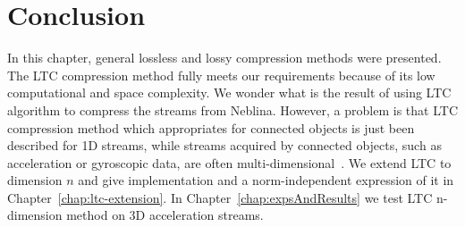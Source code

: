 \section{Conclusion}


In this chapter, general lossless and lossy compression methods were presented.
The LTC compression method fully meets our requirements because of its low
computational and space complexity.  We wonder what is the result of using LTC
algorithm to compress the streams from Neblina. However, a problem is that LTC
compression method which appropriates for connected objects is just been
described for 1D streams, while streams acquired by connected objects, such as
acceleration or gyroscopic data, are often multi-dimensional~\cite{li2018multi}.
We extend LTC to dimension $n$ and give implementation and a norm-independent
expression of it in Chapter~\ref{chap:ltc-extension}. In
Chapter~\ref{chap:expsAndResults} we test LTC n-dimension method on 3D
acceleration streams.
